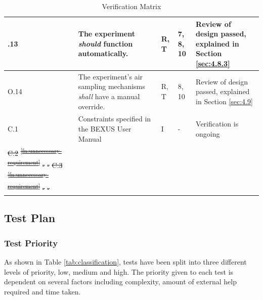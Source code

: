 \documentclass[a4paper,12pt,twoside]{article}
\providecommand{\DIFaddtex}[1]{{\protect\color{blue}\uwave{#1}}} %
\providecommand{\DIFdeltex}[1]{{\protect\color{red}\sout{#1}}}                      %
\providecommand{\DIFaddbegin}{} %
\providecommand{\DIFaddend}{} %
\providecommand{\DIFdelbegin}{} %
\providecommand{\DIFdelend}{} %
\providecommand{\DIFadd}[1]{\texorpdfstring{\DIFaddtex{#1}}{#1}} %
\providecommand{\DIFdel}[1]{\texorpdfstring{\DIFdeltex{#1}}{}} %
\newcommand{\DIFscaledelfig}{0.5}
\newlength{\DIFdelgraphicswidth} %
\newlength{\DIFdelgraphicsheight} %
\newcommand{\DIFaddincludegraphics}[2][]{{\color{blue}\fbox{\DIFOincludegraphics[#1]{#2}}}} %
\newcommand{\DIFdelincludegraphics}[2][]{%
\sbox{\DIFdelgraphicsbox}{\DIFOincludegraphics[#1]{#2}}%
\settoboxwidth{\DIFdelgraphicswidth}{\DIFdelgraphicsbox} %
\settoboxtotalheight{\DIFdelgraphicsheight}{\DIFdelgraphicsbox} %
\scalebox{\DIFscaledelfig}{%
\parbox[b]{\DIFdelgraphicswidth}{\usebox{\DIFdelgraphicsbox}\\[-\baselineskip] \rule{\DIFdelgraphicswidth}{0em}}\llap{\resizebox{\DIFdelgraphicswidth}{\DIFdelgraphicsheight}{%
\setlength{\unitlength}{\DIFdelgraphicswidth}%
\begin{picture}(1,1)%
\thicklines\linethickness{2pt} %
{\color[rgb]{1,0,0}\put(0,0){\framebox(1,1){}}}%
{\color[rgb]{1,0,0}\put(0,0){\line( 1,1){1}}}%
{\color[rgb]{1,0,0}\put(0,1){\line(1,-1){1}}}%
\end{picture}%
}\hspace*{3pt}}} %
} %
\DeclareRobustCommand{\DIFaddbegin}{\DIFOaddbegin \let\includegraphics\DIFaddincludegraphics} %
\DeclareRobustCommand{\DIFaddend}{\DIFOaddend \let\includegraphics\DIFOincludegraphics} %
\DeclareRobustCommand{\DIFdelbegin}{\DIFOdelbegin \let\includegraphics\DIFdelincludegraphics} %
\DeclareRobustCommand{\DIFdelend}{\DIFOaddend \let\includegraphics\DIFOincludegraphics} %
\begin{document}
\begin{longtable}[]{|m{}| m{} |m{} |m{}|m{}|}
\DIFadd{O}\DIFaddend .13 & The experiment \textit{should} function automatically.                                                           &      R, T        & 7, 8, 10            &    Review of design passed, explained in Section \ref{sec:4.8.3}    \\ \hline
O.14 & The experiment's air sampling mechanisms \textit{shall} have a manual override.                                                           &      R, T        & 8, 10            &    Review of design passed, explained in Section \ref{sec:4.9}    \\ \hline
C.1  & Constraints specified in the BEXUS User Manual\DIFaddbegin \DIFadd{.                                                                                                                          }\DIFaddend &       I       & -            & Verification is ongoing     \\ \hline
\DIFdelbegin \DIFdel{C.2  }%
\DIFdel{\textsuperscript{\ref{fn:unnecessary-requirement}}                                }%
\DIFdel{-        }%
\DIFdel{-            }%
\DIFdel{C.3  }%
\DIFdel{\textsuperscript{\ref{fn:unnecessary-requirement}}                                                                                                                                                 }%
\DIFdel{-        }%
\DIFdel{-            }%
\DIFdelend 

\caption{Verification Matrix\DIFaddbegin \DIFadd{.}\DIFaddend }
\label{tab:var-mat}
\end{longtable}
\raggedbottom
\pagebreak
\subsection{Test Plan}

\subsubsection{Test Priority} \DIFaddbegin \label{sec:5.2.1-testpriority}
\DIFaddend As shown in Table \ref{tab:classification}, tests have been split into three different levels of priority, low, medium and high. The priority given to each test is dependent on several factors including complexity, amount of external help required and time taken. 
\end{document}
